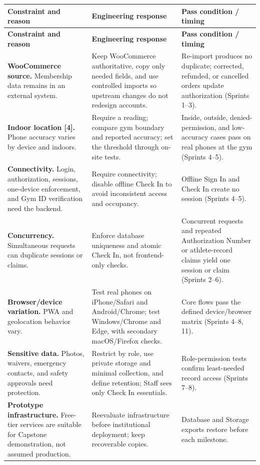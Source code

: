 \documentclass[11pt,letterpaper]{article}
\begin{document}
\begin{center}
\small
\begin{longtable}{L{3.1cm} L{5.1cm} L{5.2cm}}
\toprule
\textbf{Constraint and reason} & \textbf{Engineering response} & \textbf{Pass condition / timing} \\
\midrule
\endfirsthead
\toprule
\textbf{Constraint and reason} & \textbf{Engineering response} & \textbf{Pass condition / timing} \\
\midrule
\endhead
\bottomrule
\endlastfoot
\textbf{WooCommerce source.} Membership data remains in an external system. & Keep WooCommerce authoritative, copy only needed fields, and use controlled imports so upstream changes do not redesign accounts. & Re-import produces no duplicate; corrected, refunded, or cancelled orders update authorization (Sprints 1--3). \\
\addlinespace
\textbf{Indoor location [4].} Phone accuracy varies by device and indoors. & Require a reading; compare gym boundary and reported accuracy; set the threshold through on-site tests. & Inside, outside, denied-permission, and low-accuracy cases pass on real phones at the gym (Sprints 4--5). \\
\addlinespace
\textbf{Connectivity.} Login, authorization, sessions, one-device enforcement, and Gym ID verification need the backend. & Require connectivity; disable offline Check In to avoid inconsistent access and occupancy. & Offline Sign In and Check In create no session (Sprints 4--5). \\
\addlinespace
\textbf{Concurrency.} Simultaneous requests can duplicate sessions or claims. & Enforce database uniqueness and atomic Check In, not frontend-only checks. & Concurrent requests and repeated Authorization Number or athlete-record claims yield one session or claim (Sprints 2--6). \\
\addlinespace
\textbf{Browser/device variation.} PWA and geolocation behavior vary. & Test real phones on iPhone/Safari and Android/Chrome; test Windows/Chrome and Edge, with secondary macOS/Firefox checks. & Core flows pass the defined device/browser matrix (Sprints 4--8, 11). \\
\addlinespace
\textbf{Sensitive data.} Photos, waivers, emergency contacts, and safety approvals need protection. & Restrict by role, use private storage and minimal collection, and define retention; Staff sees only Check In essentials. & Role-permission tests confirm least-needed record access (Sprints 7--8). \\
\addlinespace
\textbf{Prototype infrastructure.} Free-tier services are suitable for Capstone demonstration, not assumed production. & Reevaluate infrastructure before institutional deployment; keep recoverable copies. & Database and Storage exports restore before each milestone. \\
\end{longtable}
\end{center}
\end{document}
